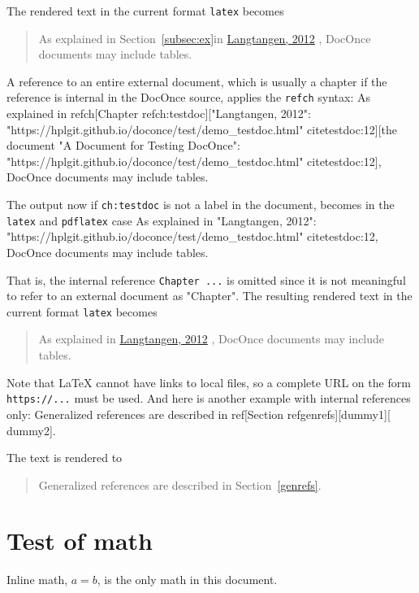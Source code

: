 \documentclass[%
oneside,                 %
final,                   %
chapterprefix=true,      %
open=right,              %
10pt]{book}
\makeatletter
\def\cleardoublepage{\clearpage\if@twoside \ifodd\c@page\else
\hbox{}
\thispagestyle{empty}
\newpage
\if@twocolumn\hbox{}\newpage\fi\fi\fi}
\newcommand{\clearemptydoublepage}{\clearpage{\pagestyle{empty}\cleardoublepage}}
\makeatother
\begin{document}
\eccq

The rendered text in the current format \texttt{latex} becomes

\begin{quote}
As explained in
Section~\ref{subsec:ex}in \href{{https://hplgit.github.io/doconce/test/demo_testdoc.html#subsec:ex}}{Langtangen, 2012}
\cite{testdoc:12}, DocOnce documents may include tables.
\end{quote}

A reference to an entire external document, which is usually a chapter
if the reference is internal in the DocOnce source, applies the
\texttt{refch} syntax:
\bccq
As explained in
refch[Chapter ref{ch:testdoc}]["Langtangen, 2012":
"https://hplgit.github.io/doconce/test/demo_testdoc.html"
cite{testdoc:12}][the document
"A Document for Testing DocOnce":
"https://hplgit.github.io/doconce/test/demo_testdoc.html"
cite{testdoc:12}], DocOnce documents may include tables.

\eccq

The output now if \texttt{ch:testdoc} is not a label in the document,
becomes in the \texttt{latex} and \texttt{pdflatex} case
\bccq
As explained in
"Langtangen, 2012":
"https://hplgit.github.io/doconce/test/demo_testdoc.html"
cite{testdoc:12}, DocOnce documents may include tables.

\eccq

That is, the internal reference \texttt{Chapter ...} is omitted since
it is not meaningful to refer to an external document as "Chapter".
The resulting rendered text in the current format \texttt{latex} becomes

\begin{quote}
As explained in
\href{{https://hplgit.github.io/doconce/test/demo_testdoc.html}}{Langtangen, 2012}
\cite{testdoc:12}, DocOnce documents may include tables.
\end{quote}

Note that {\LaTeX} cannot
have links to local files, so a complete URL on the form
\texttt{https://...} must be used.
And here is another example with internal references only:
\bccq
Generalized references are described in ref[Section ref{genrefs}][dummy1][
dummy2].

\eccq

The text is rendered to

\begin{quote}
Generalized references are described in
Section~\ref{genrefs}.
\end{quote}

\chapter{Test of math}
Inline math, $a=b$, is the only math in this document.
\clearemptydoublepage


\end{document}
